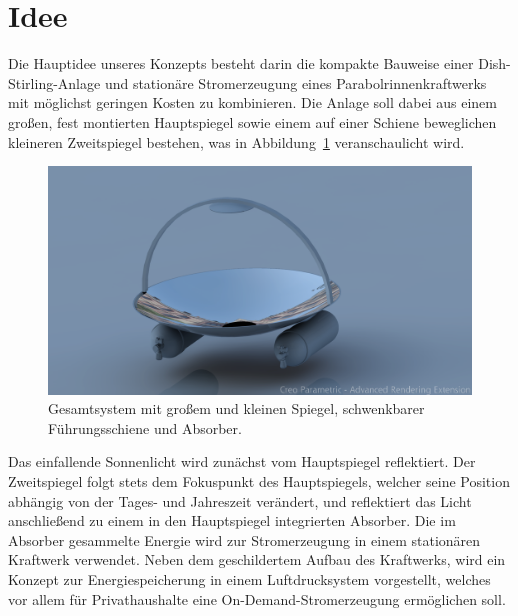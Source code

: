 \documentclass[fontsize=10pt,paper=a4,bibliography=totoc]{scrartcl}
\begin{document}
\section{Idee}
Die Hauptidee unseres Konzepts besteht darin die kompakte Bauweise einer Dish-Stirling-Anlage und stationäre Stromerzeugung eines Parabolrinnenkraftwerks mit möglichst geringen Kosten zu kombinieren. Die Anlage soll dabei aus einem großen, fest montierten Hauptspiegel sowie einem auf einer Schiene beweglichen kleineren Zweitspiegel bestehen, was in Abbildung~\ref{pic:system_rendered} veranschaulicht wird.
\begin{figure}[htb]
	\centering
	\includegraphics[width=\textwidth]{images/SMALL_MIRROR}
	\caption[Gesamtsystem]{Gesamtsystem mit großem und kleinen Spiegel, schwenkbarer Führungsschiene und Absorber.}
	\label{pic:system_rendered}
\end{figure}
Das einfallende Sonnenlicht wird zunächst vom Hauptspiegel reflektiert. Der Zweitspiegel folgt stets dem Fokuspunkt des Hauptspiegels, welcher seine Position abhängig von der Tages- und Jahreszeit verändert, und reflektiert das Licht anschließend zu einem in den Hauptspiegel integrierten Absorber.  Die im Absorber gesammelte Energie wird zur Stromerzeugung in einem stationären Kraftwerk verwendet.
Neben dem geschildertem Aufbau des Kraftwerks, wird ein Konzept zur Energiespeicherung in einem Luftdrucksystem vorgestellt, welches vor allem für Privathaushalte eine On-Demand-Stromerzeugung ermöglichen soll.
\end{document}
